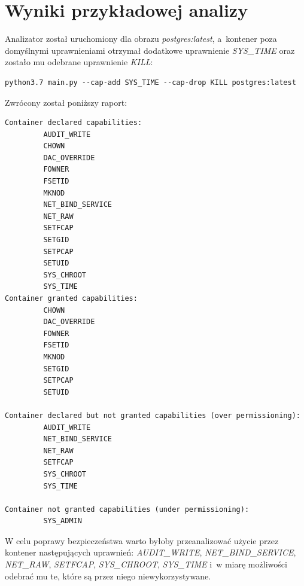 \section{Wyniki przykładowej analizy}

Analizator został uruchomiony dla obrazu \textit{postgres:latest}, a~kontener poza domyślnymi uprawnieniami otrzymał dodatkowe uprawnienie \textit{SYS\_TIME} oraz zostało mu odebrane uprawnienie \textit{KILL}:
\begin{verbatim}
python3.7 main.py --cap-add SYS_TIME --cap-drop KILL postgres:latest
\end{verbatim}
Zwrócony został poniższy raport:
\begin{verbatim}
Container declared capabilities:
         AUDIT_WRITE
         CHOWN
         DAC_OVERRIDE
         FOWNER
         FSETID
         MKNOD
         NET_BIND_SERVICE
         NET_RAW
         SETFCAP
         SETGID
         SETPCAP
         SETUID
         SYS_CHROOT
         SYS_TIME
Container granted capabilities:
         CHOWN
         DAC_OVERRIDE
         FOWNER
         FSETID
         MKNOD
         SETGID
         SETPCAP
         SETUID

Container declared but not granted capabilities (over permissioning):
         AUDIT_WRITE
         NET_BIND_SERVICE
         NET_RAW
         SETFCAP
         SYS_CHROOT
         SYS_TIME

Container not granted capabilities (under permissioning):
         SYS_ADMIN
\end{verbatim}

W celu poprawy bezpieczeństwa warto byłoby przeanalizować użycie przez kontener następujących uprawnień: \textit{AUDIT\_WRITE}, \textit{NET\_BIND\_SERVICE}, \textit{NET\_RAW}, \textit{SETFCAP}, \textit{SYS\_CHROOT}, \textit{SYS\_TIME} i~w miarę możliwości odebrać mu te, które są przez niego niewykorzystywane.